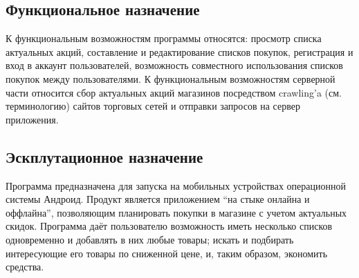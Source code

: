 \subsection{Функциональное назначение}
К функциональным возможностям программы относятся: просмотр списка актуальных
акций, составление и редактирование списков покупок, регистрация и вход в
аккаунт пользователей, возможность совместного использования списков покупок
между пользователями. К функциональным возможностям серверной части относится
сбор актуальных акций магазинов посредством crawling'a (см. терминологию)
сайтов торговых сетей и отправки запросов на сервер приложения.

\subsection{Эскплутационное назначение}
Программа предназначена для запуска на мобильных устройствах операционной
системы Андроид. Продукт является приложением ``на стыке онлайна и оффлайна'',
позволяющим планировать покупки в магазине с учетом актуальных скидок.
Программа даёт пользователю возможность иметь несколько списков одновременно и
добавлять в них любые товары; искать и подбирать интересующие его товары по
сниженной цене, и, таким образом, экономить средства.



